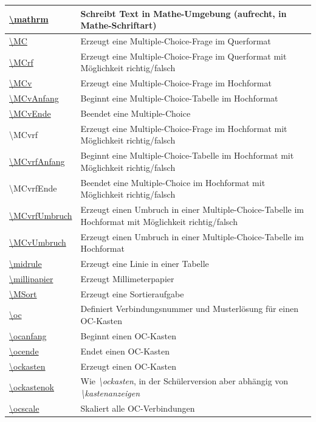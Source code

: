 \documentclass[../main.tex]{subfiles}
\begin{document}
\begin{tabularx}{\linewidth}{|l|X|}
    \hyperlink{mathrm}{\textbackslash{}mathrm}&Schreibt Text in Mathe-Umgebung (aufrecht, in Mathe-Schriftart)\\\hline
    \hyperlink{MC}{\textbackslash{}MC}&Erzeugt eine Multiple-Choice-Frage im Querformat\\\hline
    \hyperlink{MCrf}{\textbackslash{}MCrf}&Erzeugt eine Multiple-Choice-Frage im Querformat mit M\"oglichkeit richtig/falsch\\\hline
    \hyperlink{MCv}{\textbackslash{}MCv}&Erzeugt eine Multiple-Choice-Frage im Hochformat\\\hline
    \hyperlink{MCvAnfang}{\textbackslash{}MCvAnfang}&Beginnt eine Multiple-Choice-Tabelle im Hochformat\\\hline
    \hyperlink{MCvEnde}{\textbackslash{}MCvEnde}&Beendet eine Multiple-Choice\\\hline
    {\textbackslash{}MCvrf}&Erzeugt eine Multiple-Choice-Frage im Hochformat mit M\"oglichkeit richtig/falsch\\\hline
    \hyperlink{MCvrfAnfang}{\textbackslash{}MCvrfAnfang}&Beginnt eine Multiple-Choice-Tabelle im Hochformat mit M\"oglichkeit richtig/falsch\\\hline
    {\textbackslash{}MCvrfEnde}&Beendet eine Multiple-Choice im Hochformat mit M\"oglichkeit richtig/falsch\\\hline
    \hyperlink{MCvrfUmbruch}{\textbackslash{}MCvrfUmbruch}&Erzeugt einen Umbruch in einer Multiple-Choice-Tabelle im Hochformat mit M\"oglichkeit richtig/falsch\\\hline
    \hyperlink{MCvUmbruch}{\textbackslash{}MCvUmbruch}&Erzeugt einen Umbruch in einer Multiple-Choice-Tabelle im Hochformat\\\hline
    \hyperlink{midrule}{\textbackslash{}midrule}&Erzeugt eine Linie in einer Tabelle\\\hline
    \hyperlink{millipapier}{\textbackslash{}millipapier}&Erzeugt Millimeterpapier\\\hline
    \hyperlink{MSort}{\textbackslash{}MSort}&Erzeugt eine Sortieraufgabe\\\hline
    \hyperlink{oc}{\textbackslash{}oc}&Definiert Verbindungsnummer und Musterl\"osung f\"ur einen OC-Kasten\\\hline
    \hyperlink{ocanfang}{\textbackslash{}ocanfang}&Beginnt einen OC-Kasten\\\hline
    \hyperlink{ocende}{\textbackslash{}ocende}&Endet einen OC-Kasten\\\hline
    \hyperlink{ockasten}{\textbackslash{}ockasten}&Erzeugt einen OC-Kasten\\\hline
    \hyperlink{ockastenok}{\textbackslash{}ockastenok}&Wie \textit{\textbackslash ockasten}, in der Sch\"ulerversion aber abh\"angig von \textit{\textbackslash kastenanzeigen}\\\hline
    \hyperlink{ocscale}{\textbackslash{}ocscale}&Skaliert alle OC-Verbindungen\\\hline
\end{tabularx}
\end{document}
